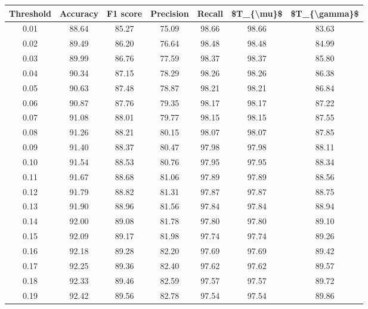 \begin{tabular}{|c|c|c|c|c|c|c|}
\hline
 Threshold &  Accuracy &  F1 score &  Precision &  Recall &  \$T\_\{\textbackslash mu\}\$ &  \$T\_\{\textbackslash gamma\}\$ \\
\hline
      0.01 &     88.64 &     85.27 &      75.09 &   98.66 &      98.66 &         83.63 \\
      0.02 &     89.49 &     86.20 &      76.64 &   98.48 &      98.48 &         84.99 \\
      0.03 &     89.99 &     86.76 &      77.59 &   98.37 &      98.37 &         85.80 \\
      0.04 &     90.34 &     87.15 &      78.29 &   98.26 &      98.26 &         86.38 \\
      0.05 &     90.63 &     87.48 &      78.87 &   98.21 &      98.21 &         86.84 \\
      0.06 &     90.87 &     87.76 &      79.35 &   98.17 &      98.17 &         87.22 \\
      0.07 &     91.08 &     88.01 &      79.77 &   98.15 &      98.15 &         87.55 \\
      0.08 &     91.26 &     88.21 &      80.15 &   98.07 &      98.07 &         87.85 \\
      0.09 &     91.40 &     88.37 &      80.47 &   97.98 &      97.98 &         88.11 \\
      0.10 &     91.54 &     88.53 &      80.76 &   97.95 &      97.95 &         88.34 \\
      0.11 &     91.67 &     88.68 &      81.06 &   97.89 &      97.89 &         88.56 \\
      0.12 &     91.79 &     88.82 &      81.31 &   97.87 &      97.87 &         88.75 \\
      0.13 &     91.90 &     88.96 &      81.56 &   97.84 &      97.84 &         88.94 \\
      0.14 &     92.00 &     89.08 &      81.78 &   97.80 &      97.80 &         89.10 \\
      0.15 &     92.09 &     89.17 &      81.98 &   97.74 &      97.74 &         89.26 \\
      0.16 &     92.18 &     89.28 &      82.20 &   97.69 &      97.69 &         89.42 \\
      0.17 &     92.25 &     89.36 &      82.40 &   97.62 &      97.62 &         89.57 \\
      0.18 &     92.33 &     89.46 &      82.59 &   97.57 &      97.57 &         89.72 \\
      0.19 &     92.42 &     89.56 &      82.78 &   97.54 &      97.54 &         89.86 \\

\end{tabular}
